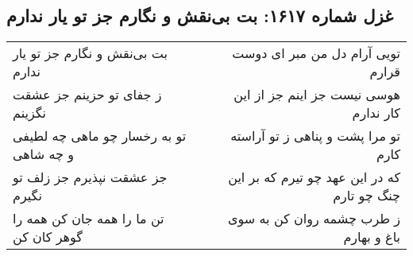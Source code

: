 \begin{center}
\section*{غزل شماره ۱۶۱۷: بت بی‌نقش و نگارم جز تو یار ندارم}
\label{sec:1617}
\begin{longtable}{l p{0.5cm} r}
بت بی‌نقش و نگارم جز تو یار ندارم
&&
تویی آرام دل من مبر ای دوست قرارم
\\
ز جفای تو حزینم جز عشقت نگزینم
&&
هوسی نیست جز اینم جز از این کار ندارم
\\
تو به رخسار چو ماهی چه لطیفی و چه شاهی
&&
تو مرا پشت و پناهی ز تو آراسته کارم
\\
جز عشقت نپذیرم جز زلف تو نگیرم
&&
که در این عهد چو تیرم که بر این چنگ چو تارم
\\
تن ما را همه جان کن همه را گوهر کان کن
&&
ز طرب چشمه روان کن به سوی باغ و بهارم
\\
\end{longtable}
\end{center}

